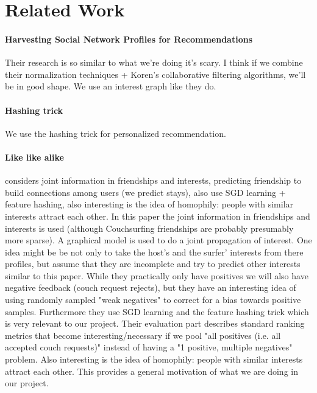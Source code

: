 \section{Related Work}


\paragraph{Harvesting Social Network Profiles for Recommendations} \cite{Liu2005}
Their research is so similar to what we're doing it's scary.
I think if we combine their normalization techniques + Koren's collaborative filtering algorithms, we'll be in good shape.
We use an interest graph like they do.

\paragraph{Hashing trick} \cite{Attenberg2009,Weinberger2012}
We use the hashing trick for personalized recommendation.

\paragraph{Like like alike} \cite{Yang2011}
considers joint information in friendships and interests,  predicting friendship
to build connections among users (we predict stays), also use SGD learning + feature hashing, also interesting is the idea of homophily:  people with similar interests attract each other.
In this paper the joint information in friendships and interests is used (although Couchsurfing friendships are probably presumably more sparse).
A graphical model is used to do a joint propagation of interest.
One idea might be be not only to take the host's and the surfer' interests from there profiles, but assume that they are incomplete and try to predict other interests similar to this paper. While they practically only have positives we will also have negative feedback (couch request rejects), but they have an interesting idea of using randomly sampled "weak negatives" to correct for a bias towards positive samples.
Furthermore they use SGD learning and the feature hashing trick which is very relevant to our project.
Their evaluation part describes standard ranking metrics that become interesting/necessary if we pool "all positives (i.e. all accepted couch requests)" instead of having a "1 positive, multiple negatives" problem.
Also interesting is the idea of homophily: people with similar interests attract each other. This provides a general motivation of what we are doing in our project.

